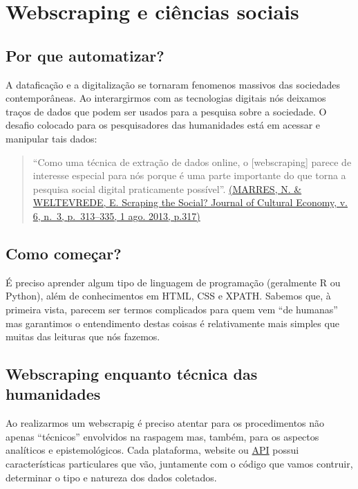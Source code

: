 \documentclass[
]{book}
\begin{document}
\hypertarget{webscraping-e-ciuxeancias-sociais}{%
\chapter{Webscraping e ciências sociais}\label{webscraping-e-ciuxeancias-sociais}}

\hypertarget{por-que-automatizar}{%
\section{Por que automatizar?}\label{por-que-automatizar}}

A dataficação e a digitalização se tornaram fenomenos massivos das sociedades contemporâneas. Ao interargirmos com as tecnologias digitais nós deixamos traços de dados que podem ser usados para a pesquisa sobre a sociedade. O desafio colocado para os pesquisadores das humanidades está em acessar e manipular tais dados:

\begin{quote}
``Como uma técnica de extração de dados online, o {[}webscraping{]} parece de interesse especial para nós porque é uma parte importante do que torna a pesquisa social digital praticamente possível''. \href{https://www.tandfonline.com/doi/abs/10.1080/17530350.2013.772070}{(MARRES, N. \& WELTEVREDE, E. Scraping the Social? Journal of Cultural Economy, v. 6, n.~3, p.~313--335, 1 ago. 2013, p.317)}
\end{quote}

\hypertarget{como-comeuxe7ar}{%
\section{Como começar?}\label{como-comeuxe7ar}}

É preciso aprender algum tipo de linguagem de programação (geralmente R ou Python), além de conhecimentos em HTML, CSS e XPATH. Sabemos que, à primeira vista, parecem ser termos complicados para quem vem ``de humanas'' mas garantimos o entendimento destas coisas é relativamente mais simples que muitas das leituras que nós fazemos.

\hypertarget{webscraping-enquanto-tuxe9cnica-das-humanidades}{%
\section{Webscraping enquanto técnica das humanidades}\label{webscraping-enquanto-tuxe9cnica-das-humanidades}}

Ao realizarmos um webscrapig é preciso atentar para os procedimentos não apenas ``técnicos'' envolvidos na raspagem mas, também, para os aspectos analíticos e epistemológicos. Cada plataforma, website ou \href{https://canaltech.com.br/software/o-que-e-api/}{API} possui características particulares que vão, juntamente com o código que vamos contruir, determinar o tipo e natureza dos dados coletados.
\end{document}
